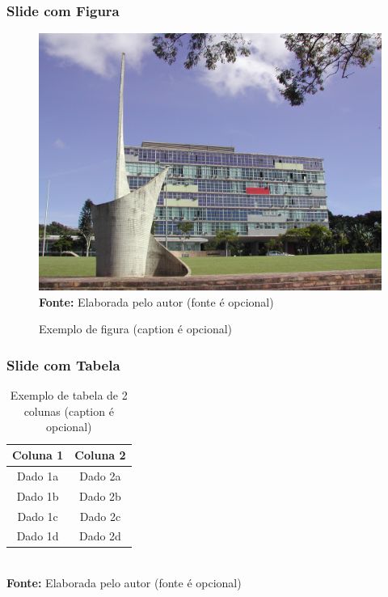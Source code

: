 \begin{frame}

    \frametitle{Slide com Figura}
    
    \begin{figure}[!htbp]
       	\centering
       	\caption{Exemplo de figura (caption é opcional)}
       	\includegraphics[scale=0.3]{imagens/exemploFigura}
        \\\small{\textbf{Fonte:} Elaborada pelo autor (fonte é opcional)}%
     \end{figure}
         
\end{frame}


\begin{frame}

    \frametitle{Slide com Tabela}
    
    \begin{table}[!htbp]
       	\centering
       	\caption{Exemplo de tabela de 2 colunas (caption é opcional)}
       	\begin{tabular}{ c | c }
       		\hline
       		\textbf{Coluna 1} & \textbf{Coluna 2} \\ \hline
       		Dado 1a           & Dado 2a           \\ \hline
       		Dado 1b           & Dado 2b           \\ \hline
       		Dado 1c           & Dado 2c           \\ \hline
       		Dado 1d           & Dado 2d           \\ \hline
       	\end{tabular}
       	\\ \vspace{0.2cm}
       	\small{\textbf{Fonte:} Elaborada pelo autor (fonte é opcional)}%
     \end{table}
         
\end{frame}



